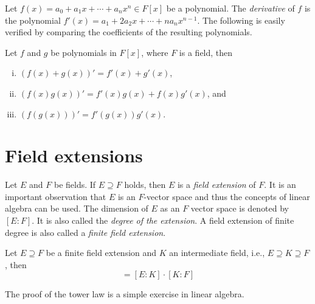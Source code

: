 Let $f(x) = a_0 + a_1x + \cdots + a_n x^n ∈ F[x]$  be a polynomial. The \emph{derivative} of $f$ is the polynomial $f'(x) = a_1 + 2 a_2x + \cdots + n a_n x^{n-1}$. The following is easily verified by comparing the coefficients of the resulting polynomials. 
\begin{theorem}
  \label{thr:10}
  Let $f$ and $g$ be polynomials in $F[x]$, where $F$ is a field, then
  \begin{enumerate}[i)]
  \item $(f(x) + g(x))' = f'(x) +  g'(x)$, 
  \item $(f(x) g(x))' = f'(x)g(x)  +  f(x) g'(x)$, and
  \item $(f(g(x)))' = f'(g(x))g'(x)$. 
  \end{enumerate}
\end{theorem}



\section{Field extensions}
\label{sec:field-extensions}

Let $E$ and $F$ be fields. If $E ⊇ F$ holds, then $E$ is a \emph{field extension} of $F$. It is an important observation that $E$ is an $F$-vector space and thus the concepts of linear algebra can be used. The dimension of $E$ as an $F$ vector space is denoted by $[E:F]$. It is also called the \emph{degree of the extension}. A field extension of finite degree is also called a \emph{finite field extension}.

\begin{theorem} 
  \label{thr:10}
  Let $E ⊇F$ be a finite field extension and $K$ an intermediate field, i.e.,  $E ⊇K ⊇F$, then
  \begin{displaymath}
    [E:F] = [E:K] ⋅ [K:F] 
  \end{displaymath}
\end{theorem}
The proof of the tower  law is a simple exercise in linear algebra. 

